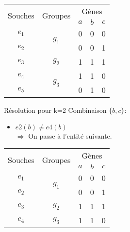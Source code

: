\begin{overprint}
{\begin{minipage}[l]{0.46\linewidth}
\begin{center}
					\begin{tabular}{|c||c|c|c|c|}
						\hline
						\multirow{2}{*}{Souches}&\multirow{2}{*}{Groupes}&\multicolumn{3}{c|}{Gènes
						}\\
						&&$a$&\cellcolor{blue!75}$b$&\cellcolor{blue!75}$c$\\
						\hline
						\hline
						$e_1$&\multirow{2}{*}{$g_1$}& 0 & 0 & 0\\
						\cline{1-1} \cline{3-5}
						$e_2$&& 0 & \cellcolor{cyan}0 & 1\\
						\hline
						\hline
						$e_3$&$g_2$& 1 & 1 & 1\\
						\hline
						\hline
						$e_4$&\multirow{2}{*}{$g_3$}& 1 & \cellcolor{cyan}1 & 0\\
						\cline{1-1} \cline{3-5}
						$e_5$&& 0 & 1 & 0\\
						\hline
					\end{tabular}
				\end{center}
			\end{minipage}
			\hspace{0.6cm}
			\begin{minipage}[r]{0.46\linewidth}
				\begin{block}{Résolution pour k=2}
					Combinaison $\{b,c\}$:
					\begin{itemize}
						\item $e2(b) \not = e4(b) $ \\ $\Rightarrow$ On passe à l'entité suivante.
					\end{itemize}
				\end{block}
			\end{minipage}
		}
		\only<25-26>
		{
			\begin{minipage}[l]{0.46\linewidth}
				\begin{center}
					\begin{tabular}{|c||c|c|c|c|}
						\hline
						\multirow{2}{*}{Souches}&\multirow{2}{*}{Groupes}&\multicolumn{3}{c|}{Gènes
						}\\
						&&$a$&\cellcolor{blue!75}$b$&\cellcolor{blue!75}$c$\\
						\hline
						\hline
						$e_1$&\multirow{2}{*}{$g_1$}& 0 & 0 & 0\\
						\cline{1-1} \cline{3-5}
						$e_2$&& 0 & \cellcolor{cyan}0 & 1\\
						\hline
						\hline
						$e_3$&$g_2$& 1 & 1 & 1\\
						\hline
						\hline
						$e_4$&\multirow{2}{*}{$g_3$}& 1 & 1 & 0\\

\end{tabular}
\end{center}
\end{minipage}}
\end{overprint}
